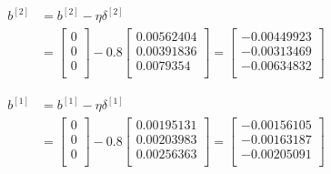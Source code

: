 \documentclass{article}
\begin{document}
\[
    \begin{aligned}
        b^{[2]} & =b^{[2]}-\eta\delta^{[2]} \\
                & =\begin{bmatrix}
                       0 \\
                       0 \\
                       0 \\
                   \end{bmatrix}
        - 0.8 \begin{bmatrix}
                  0.00562404 \\
                  0.00391836 \\
                  0.0079354  \\
              \end{bmatrix}
        = \begin{bmatrix}
              -0.00449923 \\
              -0.00313469 \\
              -0.00634832 \\
          \end{bmatrix}
    \end{aligned}
\]

\[
    \begin{aligned}
        b^{[1]} & =b^{[1]}-\eta\delta^{[1]} \\
                & =\begin{bmatrix}
                       0 \\
                       0 \\
                       0 \\
                   \end{bmatrix}
        - 0.8 \begin{bmatrix}
                  0.00195131 \\
                  0.00203983 \\
                  0.00256363 \\
              \end{bmatrix}
        = \begin{bmatrix}
              -0.00156105 \\
              -0.00163187 \\
              -0.00205091 \\
          \end{bmatrix}
    \end{aligned}
\]
\end{document}
